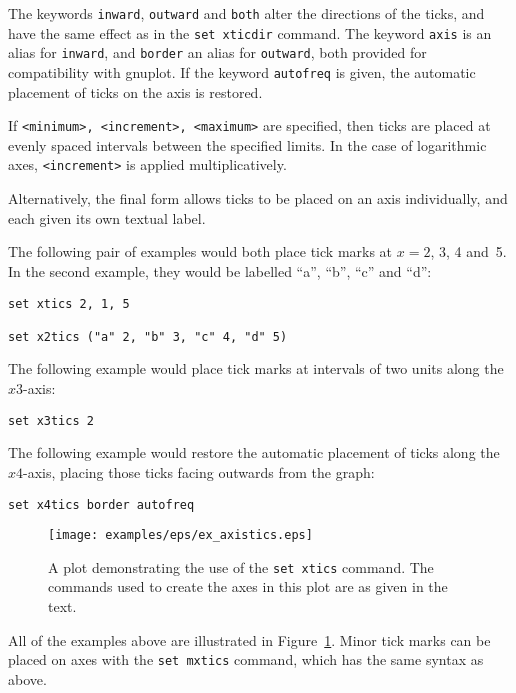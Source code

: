 The keywords \texttt{inward}, \texttt{outward} and \texttt{both} alter the
directions of the ticks, and have the same effect as in the \texttt{set
xticdir} command. The keyword \texttt{axis} is an alias for \texttt{inward},
and \texttt{border} an alias for \texttt{outward}, both provided for
compatibility with gnuplot. If the keyword \texttt{autofreq} is given, the automatic
placement of ticks on the axis is restored.

If \texttt{<minimum>, <increment>, <maximum>} are specified, then ticks are
placed at evenly spaced intervals between the specified limits. In the case of
logarithmic axes, \texttt{<increment>} is applied multiplicatively.

Alternatively, the final form allows ticks to be placed on an axis
individually, and each given its own textual label.

The following pair of examples would both place tick marks at $x=2$, 3, 4 and~5.
In the second example, they would be labelled ``a'', ``b'', ``c'' and ``d'':

\begin{verbatim}
set xtics 2, 1, 5

set x2tics ("a" 2, "b" 3, "c" 4, "d" 5)
\end{verbatim}

The following example would place tick marks at intervals of two units along
the $x3$-axis:

\begin{verbatim}
set x3tics 2
\end{verbatim}

The following example would restore the automatic placement of ticks along the
$x4$-axis, placing those ticks facing outwards from the graph:

\begin{verbatim}
set x4tics border autofreq
\end{verbatim}

\begin{figure}
\begin{center}
\texttt{[image: examples/eps/ex\_axistics.eps]}
\end{center}
\caption{A plot demonstrating the use of the {\tt set xtics} command. The commands used to create the axes in this plot are as given in the text.}
\label{fig:ex_axistics}
\end{figure}


All of the examples above are illustrated in Figure~\ref{fig:ex_axistics}.
Minor tick marks can be placed on axes with the \texttt{set mxtics} command,
which has the same syntax as above.

